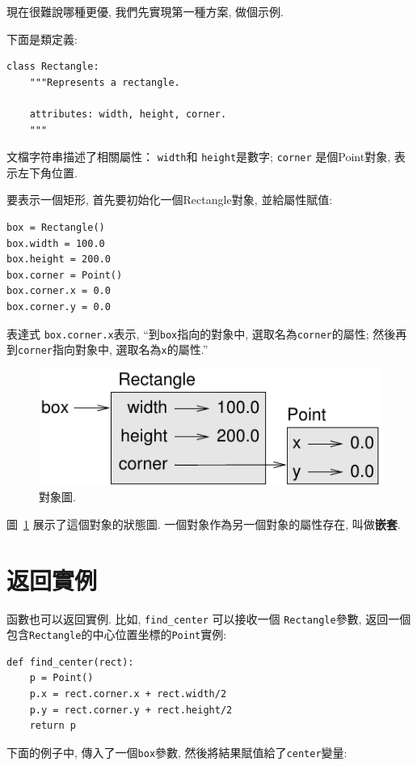 \documentclass[10pt]{book}
\begin{document}
現在很難說哪種更優, 我們先實現第一種方案, 做個示例. 

下面是類定義:

\begin{verbatim}
class Rectangle:
    """Represents a rectangle. 

    attributes: width, height, corner.
    """
\end{verbatim}
%
文檔字符串描述了相關屬性： {\tt width}和
{\tt height}是數字; {\tt corner} 是個Point對象, 表示左下角位置. 

要表示一個矩形, 首先要初始化一個Rectangle對象, 並給屬性賦值:

\begin{verbatim}
box = Rectangle()
box.width = 100.0
box.height = 200.0
box.corner = Point()
box.corner.x = 0.0
box.corner.y = 0.0
\end{verbatim}
%

表達式 {\tt box.corner.x}表示, 
``到{\tt box}指向的對象中, 選取名為{\tt corner}的屬性;
然後再到{\tt corner}指向對象中, 選取名為{\tt x}的屬性.''

\begin{figure}
\centerline
{\includegraphics[scale=0.8]{figs/rectangle.pdf}}
\caption{對象圖.}
\label{fig.rectangle}
\end{figure}


圖~\ref{fig.rectangle} 展示了這個對象的狀態圖. 
一個對象作為另一個對象的屬性存在, 叫做{\bf 嵌套}. 


\section{返回實例}

函數也可以返回實例. 比如, \verb"find_center" 可以接收一個
 {\tt Rectangle}參數, 返回一個包含{\tt Rectangle}的中心位置坐標的{\tt Point}實例:

\begin{verbatim}
def find_center(rect):
    p = Point()
    p.x = rect.corner.x + rect.width/2
    p.y = rect.corner.y + rect.height/2
    return p
\end{verbatim}
%
下面的例子中, 傳入了一個{\tt box}參數, 
然後將結果賦值給了{\tt center}變量:
\end{document}

